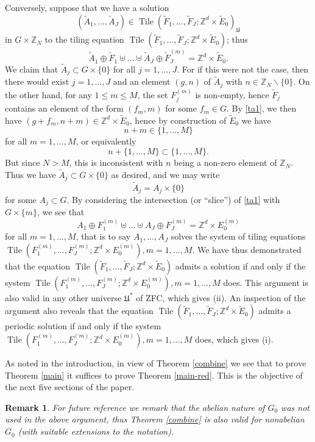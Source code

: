 \documentclass[reqno,a4paper,12pt]{amsart}
\numberwithin{equation}{section}
\numberwithin{figure}{section}
\def\Z{\mathbb{Z}}
\renewcommand\leq{\leqslant}
\newcommand{\Tile}{\operatorname{Tile}}
\newcommand{\Universe}{{\mathfrak{U}}}
\theoremstyle{plain}
\newtheorem{remark}[thm]{Remark}
\theoremstyle{definition}
\begin{document}
Conversely, suppose that we have a solution
$$(\tilde A_1,\dots,\tilde A_J) \in \Tile(\tilde F_1,\dots,\tilde F_J; \Z^d \times \tilde E_0)_\Universe$$
in $G \times \Z_N$ to the tiling equation
$\Tile(\tilde F_1,\dots,\tilde F_J; \Z^d \times \tilde E_0)$; thus
\begin{equation}\label{ta1}
 \tilde A_1 \oplus \tilde F_1 \uplus \dots \uplus \tilde A_J \oplus \tilde F_J^{(m)} = \Z^d \times \tilde E_0.
 \end{equation}
 We claim that $\tilde A_j \subset G \times \{0\}$ for all $j=1,\dots,J$.  For if this were not the case, then there would exist $j=1,\dots,J$ and an element $(g,n)$ of $\tilde A_j$ with $n \in \Z_N \backslash \{0\}$.  On the other hand, for any $1 \leq m \leq M$, the set $F_j^{(m)}$ is non-empty, hence $\tilde F_j$ contains an element of the form $(f_m,m)$ for some $f_m \in G$.  By \eqref{ta1}, we then have $(g+f_m, n+m) \in \Z^d \times \tilde E_0$, hence by construction of $\tilde E_0$ we have
$$ n + m \in \{1,\dots,M\}$$
for all $m=1,\dots,M$, or equivalently
$$ n + \{1,\dots,M\} \subset \{1,\dots,M\}.$$
But since $N > M$, this is inconsistent with $n$ being a non-zero element of $\Z_N$.  Thus we have $\tilde A_j \subset G \times \{0\}$ as desired, and we may write
$$ \tilde A_j = A_j \times \{0\}$$
for some $A_j \subset G$.  By considering the intersection (or ``slice'') of \eqref{ta1} with $G \times \{m\}$, we see that
$$
A_1 \oplus F^{(m)}_1 \uplus \dots \uplus A_J \oplus F^{(m)}_J = \Z^d \times E^{(m)}_0
$$
for all $m=1,\dots,M$, that is to say $A_1,\dots,A_J$ solves the system
of tiling equations $\Tile(F_1^{(m)},\dots,F_J^{(m)}; \Z^d \times E_0^{(m)}), m=1,\dots,M$.  We have thus demonstrated that the equation $\Tile(\tilde F_1,\dots,\tilde F_J; \Z^d \times \tilde E_0)$ admits a solution if and only if the system $\Tile(F_1^{(m)},\dots,F_J^{(m)}; \Z^d \times E_0^{(m)}), m=1,\dots,M$ does.  This argument is also valid in any other universe $\Universe^*$ of ZFC, which gives (ii).  An inspection of the argument also reveals that the equation $\Tile(\tilde F_1,\dots,\tilde F_J; \Z^d \times \tilde E_0)$ admits a periodic solution if and only if the system $\Tile(F_1^{(m)},\dots,F_J^{(m)}; \Z^d \times E_0^{(m)}), m=1,\dots,M$ does, which gives (i).

As noted in the introduction, in view of Theorem \ref{combine} we see that to prove Theorem \ref{main} it suffices to prove Theorem \ref{main-red}.  This is the objective of the next five sections of the paper.

\begin{remark}\label{nonab} For future reference we remark that the abelian nature of $G_0$ was not used in the above argument, thus Theorem \ref{combine} is also valid for nonabelian $G_0$ (with suitable extensions to the notation).
\end{remark}
\end{document}
